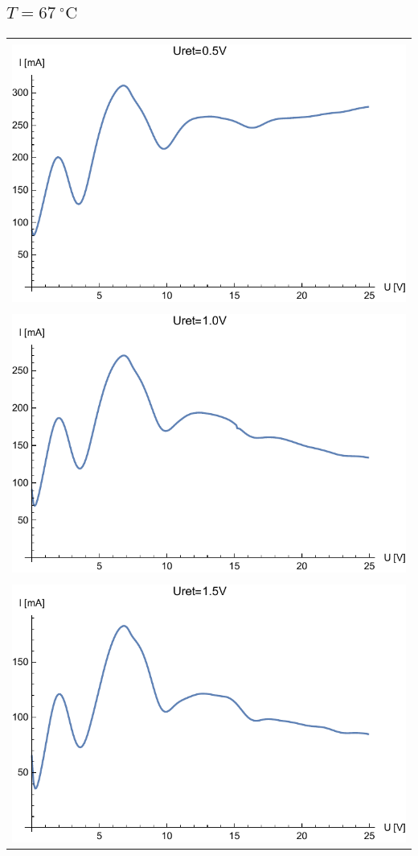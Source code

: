 \documentclass[paper=a4, fontsize=12pt]{scrartcl}
\begin{document}
\subsection{$T=67\:^\circ\mathrm{C}$}
\begin{tabular}{|c|}
\hline\\
\includegraphics[width=0.625\linewidth]{wyk1}
\label{fig:wyk1}\\
\hline\\
\includegraphics[width=0.625\linewidth]{wyk4}
\label{fig:wyk4}\\
\hline\\	\includegraphics[width=0.625\linewidth]{wyk5}
\label{fig:wyk5}\\
\hline
\end{tabular}
\end{document}
